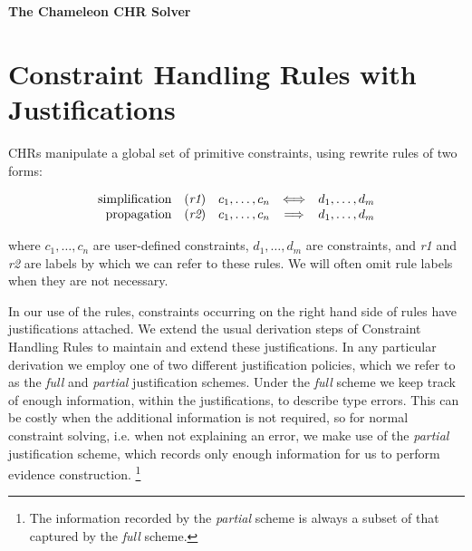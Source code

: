 \documentclass{article}
\newcommand{\ba}{\begin{array}}
\newcommand{\ea}{\end{array}}
\newcommand{\bda}{\[\ba}
\newcommand{\eda}{\ea\]}
\newcommand{\simparrow}[0]{\Longleftrightarrow}
\newcommand{\proparrow}[0]{\Longrightarrow}
\begin{document}
{\huge \bf The Chameleon CHR Solver}


\section{Constraint Handling Rules with Justifications} \label{sec:chrs}

CHRs manipulate a global set of primitive constraints, using rewrite rules of 
two forms:

\newcommand{\rulelabel}[1]{\mbox{({\it #1})}}

\bda{rclcl}
\mbox{simplification} & \rulelabel{r1} & 
        c_1, \ldots, c_n & \simparrow & d_1, \ldots, d_m \\
        
{\mbox {propagation}} & \rulelabel{r2} &
        c_1, \ldots, c_n & \proparrow & d_1, \ldots, d_m
\eda


where $c_1, \ldots, c_n$ are user-defined constraints, 
$d_1, \ldots, d_m$ are constraints, and {\it r1} and {\it r2} are labels by
which we can refer to these rules. We will often omit rule labels when they are
not necessary.



In our use of the rules, constraints occurring on the right hand
side of rules have justifications attached.
We extend the usual derivation steps of Constraint Handling Rules
to maintain and extend these justifications.
In any particular derivation we employ one of two different justification 
policies, which we refer to as the \emph{full} and \emph{partial} justification
schemes.
Under the \emph{full} scheme we keep track of enough information, within
the justifications, to describe type errors.
This can be costly when the additional information is not required, so for 
normal constraint solving, i.e. when not explaining an error, we make use
of the \emph{partial} justification scheme, which records only enough
information for us to perform evidence construction.
\footnote{ The information recorded by the \emph{partial} scheme is always a
subset of that captured by the \emph{full} scheme. }
\end{document}
